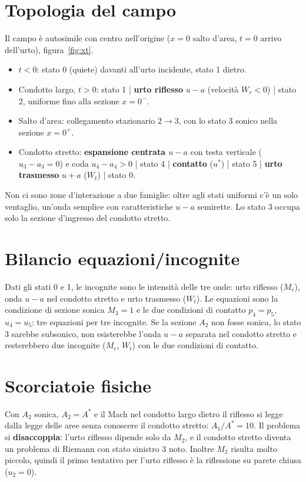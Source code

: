 \documentclass[11pt,a4paper]{article}
\newcommand{\uma}{u-a}
\newcommand{\upa}{u+a}
\newcommand{\Mr}{M_{r}}
\begin{document}
\section{Topologia del campo}
Il campo è autosimile con centro nell'origine ($x=0$ salto d'area, $t=0$ arrivo dell'urto), figura~\ref{fig:xt}.
\begin{itemize}
  \item $t<0$: stato 0 (quiete) davanti all'urto incidente, stato 1 dietro.
  \item Condotto largo, $t>0$: stato 1 | \textbf{urto riflesso} $\uma$ (velocità $W_r<0$) | stato 2,
    uniforme fino alla sezione $x=0^-$.
  \item Salto d'area: collegamento stazionario $2\to3$, con lo stato 3 sonico nella sezione $x=0^+$.
  \item Condotto stretto: \textbf{espansione centrata $\uma$} con testa verticale ($u_3-a_3=0$) e coda
    $u_4-a_4>0$ | stato 4 | \textbf{contatto} ($u^*$) | stato 5 | \textbf{urto trasmesso} $\upa$ ($W_t$) |
    stato 0.
\end{itemize}
Non ci sono zone d'interazione a due famiglie: oltre agli stati uniformi c'è un solo ventaglio, un'onda
semplice con caratteristiche $\uma$ semirette. Lo stato 3 occupa solo la sezione d'ingresso del condotto
stretto.

\section{Bilancio equazioni/incognite}
Dati gli stati 0 e 1, le incognite sono le intensità delle tre onde: urto riflesso ($\Mr$), onda $\uma$ nel
condotto stretto e urto trasmesso ($W_t$). Le equazioni sono la condizione di sezione sonica $M_3=1$ e le due
condizioni di contatto $p_4=p_5$, $u_4=u_5$: tre equazioni per tre incognite.
Se la sezione $A_2$ non fosse sonica, lo stato 3 sarebbe subsonico, non esisterebbe l'onda $\uma$ separata
nel condotto stretto e resterebbero due incognite ($\Mr$, $W_t$) con le due condizioni di contatto.

\section{Scorciatoie fisiche}
Con $A_2$ sonica, $A_2=A^*$ e il Mach nel condotto largo dietro il riflesso si legge dalla legge delle aree
senza conoscere il condotto stretto: $A_1/A^*=10$. Il problema si \textbf{disaccoppia}: l'urto riflesso
dipende solo da $M_2$, e il condotto stretto diventa un problema di Riemann con stato sinistro 3 noto.
Inoltre $M_2$ risulta molto piccolo, quindi il primo tentativo per l'urto riflesso è la riflessione su
parete chiusa ($u_2=0$).
\end{document}
